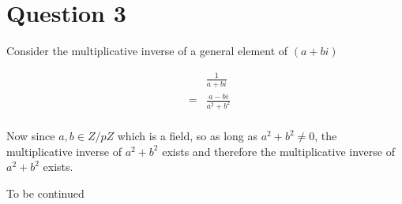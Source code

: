 \section*{Question 3}
Consider the multiplicative inverse of a general element of $ (a + bi) $ 

\begin{eqnarray*}
  & & \frac{1}{a + bi} \\
  &=& \frac{a - bi}{a^2 + b^2} \\
\end{eqnarray*}

Now since $ a, b \in Z/pZ $ which is a field, so as long as $ a^2 + b^2 \ne 0 $, the multiplicative inverse of $ a^2 + b^2 $ exists and therefore the multiplicative inverse of $ a^2 + b^2 $ exists.

To be continued